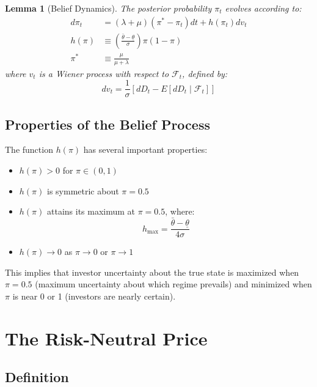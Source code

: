 \documentclass[12pt]{article}
\newtheorem{lemma}{Lemma}
\begin{document}
\begin{lemma}[Belief Dynamics]
The posterior probability $\pi_t$ evolves according to:
\begin{align}
d\pi_t &= (\lambda + \mu)(\pi^* - \pi_t)dt + h(\pi_t)dv_t \label{eq:belief}\\
h(\pi) &\equiv \left(\frac{\bar{\theta} - \underline{\theta}}{\sigma}\right) \pi(1-\pi) \label{eq:h}\\
\pi^* &\equiv \frac{\mu}{\mu + \lambda} \label{eq:pi_star}
\end{align}
where $v_t$ is a Wiener process with respect to $\mathcal{F}_t$, defined by:
\begin{equation}
dv_t = \frac{1}{\sigma}\left[dD_t - E[dD_t \mid \mathcal{F}_t]\right]
\end{equation}
\end{lemma}

\subsection{Properties of the Belief Process}

The function $h(\pi)$ has several important properties:
\begin{itemize}
    \item $h(\pi) > 0$ for $\pi \in (0,1)$
    \item $h(\pi)$ is symmetric about $\pi = 0.5$
    \item $h(\pi)$ attains its maximum at $\pi = 0.5$, where:
    \begin{equation}
    h_{\max} = \frac{\bar{\theta} - \underline{\theta}}{4\sigma}
    \end{equation}
    \item $h(\pi) \to 0$ as $\pi \to 0$ or $\pi \to 1$
\end{itemize}

This implies that investor uncertainty about the true state is maximized when $\pi = 0.5$ (maximum uncertainty about which regime prevails) and minimized when $\pi$ is near 0 or 1 (investors are nearly certain).

\section{The Risk-Neutral Price}

\subsection{Definition}
\end{document}

